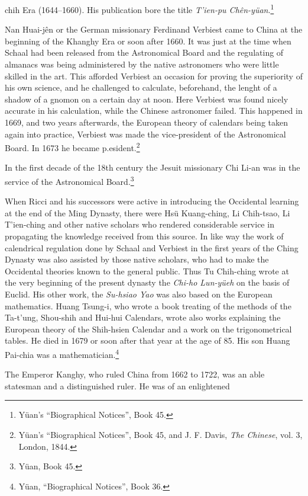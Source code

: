 \documentclass[11pt]{article}
\newcommand{\scanpage}[2]{\clearpage\setcounter{footnote}{0}\noindent{\footnotesize\color{gray}PDF page #1 · #2}\par\medskip}
\newcommand{\scanfooter}{}
\begin{document}
\scanpage{0130}{Chapter 17, printed page 116}
\setcounter{footnote}{0}
chih Era (1644--1660). His publication bore the title \emph{T'ien-pu Chên-yüan}.\footnote{Yüan's ``Biographical Notices'', Book 45.}

Nan Huai-jên or the German missionary Ferdinand Verbiest came to China at the beginning of the Khanghy Era or soon after 1660. It was just at the time when Schaal had been released from the Astronomical Board and the regulating of almanacs was being administered by the native astronomers who were little skilled in the art. This afforded Verbiest an occasion for proving the superiority of his own science, and he challenged to calculate, beforehand, the lenght of a shadow of a gnomon on a certain day at noon. Here Verbiest was found nicely accurate in his calculation, while the Chinese astronomer failed. This happened in 1669, and two years afterwards, the European theory of calendars being taken again into practice, Verbiest was made the vice-president of the Astronomical Board. In 1673 he became p.esident.\footnote{Yüan's ``Biographical Notices'', Book 45, and J. F. Davis, \emph{The Chinese}, vol. 3, London, 1844.}

In the first decade of the 18th century the Jesuit missionary Chi Li-an was in the service of the Astronomical Board.\footnote{Yüan, Book 45.}

When Ricci and his successors were active in introducing the Occidental learning at the end of the Ming Dynasty, there were Hsü Kuang-ching, Li Chih-tsao, Li T'ien-ching and other native scholars who rendered considerable service in propagating the knowledge received from this source. In like way the work of calendrical regulation done by Schaal and Verbiest in the first years of the Ching Dynasty was also assisted by those native scholars, who had to make the Occidental theories known to the general public. Thus Tu Chih-ching wrote at the very beginning of the present dynasty the \emph{Chi-ho Lun-yüeh} on the basis of Euclid. His other work, the \emph{Su-hsiao Yao} was also based on the European mathematics. Huang Tsung-i, who wrote a book treating of the methods of the Ta-t'ung, Shou-shih and Hui-hui Calendars, wrote also works explaining the European theory of the Shih-hsien Calendar and a work on the trigonometrical tables. He died in 1679 or soon after that year at the age of 85. His son Huang Pai-chia was a mathematician.\footnote{Yüan, ``Biographical Notices'', Book 36.}

The Emperor Kanghy, who ruled China from 1662 to 1722, was an able statesman and a distinguished ruler. He was of an enlightened
\scanfooter
\end{document}
